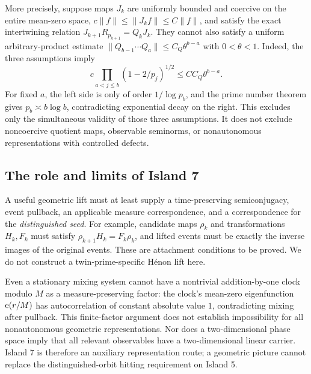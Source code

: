 More precisely, suppose maps $J_k$ are uniformly bounded and coercive on the entire mean-zero space,
$c\|f\|\le\|J_kf\|\le C\|f\|$, and satisfy the exact intertwining relation
$J_{k+1}R_{p_{k+1}}=Q_kJ_k$.
They cannot also satisfy a uniform arbitrary-product estimate
$\|Q_{b-1}\cdots Q_a\|\le C_Q\theta^{b-a}$ with $0<\theta<1$.
Indeed, the three assumptions imply
\[
c\prod_{a<j\le b}(1-2/p_j)^{1/2}\le CC_Q\theta^{b-a}.
\]
For fixed $a$, the left side is only of order $1/\log p_b$, and the prime number theorem gives $p_b\asymp b\log b$, contradicting exponential decay on the right.
This excludes only the simultaneous validity of those three assumptions. It does not exclude noncoercive quotient maps, observable seminorms, or nonautonomous representations with controlled defects\cite{archiveintertwiner}.

\subsection{The role and limits of Island 7}
A useful geometric lift must at least supply a time-preserving semiconjugacy, event pullback, an applicable measure correspondence, and a correspondence for the \emph{distinguished seed}.
For example, candidate maps $\rho_k$ and transformations $H_k,F_k$ must satisfy
$\rho_{k+1}H_k=F_k\rho_k$, and lifted events must be exactly the inverse images of the original events.
These are attachment conditions to be proved. We do not construct a twin-prime-specific H\'enon lift here.

Even a stationary mixing system cannot have a nontrivial addition-by-one clock modulo $M$ as a measure-preserving factor: the clock's mean-zero eigenfunction $\mathrm e(r/M)$ has autocorrelation of constant absolute value $1$, contradicting mixing after pullback.
This finite-factor argument does not establish impossibility for all nonautonomous geometric representations.
Nor does a two-dimensional phase space imply that all relevant observables have a two-dimensional linear carrier.
Island 7 is therefore an auxiliary representation route; a geometric picture cannot replace the distinguished-orbit hitting requirement on Island 5.
